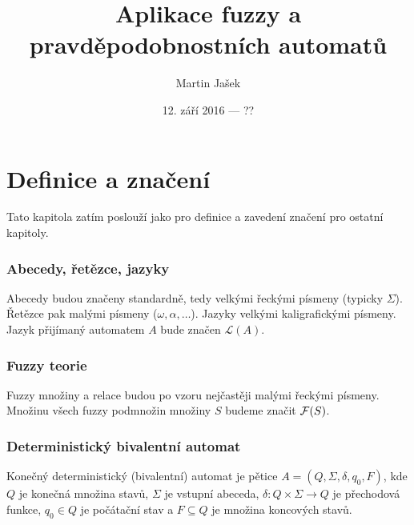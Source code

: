 \documentclass[a4paper,10pt]{article}
\title{Aplikace fuzzy a pravděpodobnostních automatů}
\author{Martin Jašek}
\date{12. září 2016 --- ??}
\begin{document}
\maketitle
\tableofcontents
\newpage

\section{Definice a značení}
Tato kapitola zatím poslouží jako  pro definice a zavedení značení pro ostatní kapitoly.

\subsubsection*{Abecedy, řetězce, jazyky}
Abecedy budou značeny standardně, tedy velkými řeckými písmeny (typicky $\Sigma$). Řetězce pak malými písmeny ($\omega, \alpha, \dots$). Jazyky velkými kaligrafickými písmeny. Jazyk přijímaný automatem $A$ bude značen $\mathcal{L}(A)$.

\subsubsection*{Fuzzy teorie}
Fuzzy množiny a relace budou po vzoru \cite{AstGonMenGar-FuzzAutEpsMovCmpFuzzMeasBtwStrs} nejčastěji malými řeckými písmeny. Množinu všech fuzzy podmnožin množiny $S$ budeme značit $\mathcal{F}(S)$.

\subsubsection*{Deterministický bivalentní automat}


\begin{definition}
 Konečný deterministický (bivalentní) automat je pětice $A = ( Q, \Sigma, \delta, q_0, F )$, kde $Q$ je konečná množina stavů, $\Sigma$ je vstupní abeceda, $\delta: Q \times \Sigma \rightarrow Q$ je přechodová funkce, $q_0 \in Q$ je počátační stav a $F \subseteq Q$ je množina koncových stavů.
\end{definition}
\end{document}
